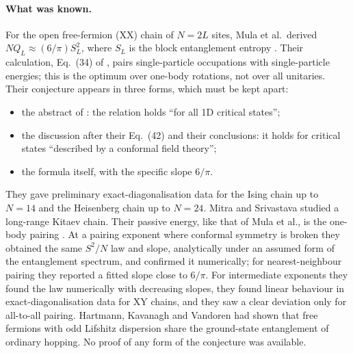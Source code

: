 \documentclass[11pt,a4paper]{article}
\theoremstyle{remark}
\begin{document}
\paragraph{What was known.} For the open free-fermion (XX) chain of $N=2L$ sites, Mula et al.\ derived $NQ_L\approx(6/\pi)S_L^2$, where $S_L$ is the block entanglement entropy \cite[Eq.~(42)]{mula}. Their calculation, Eq.~(34) of \cite{mula}, pairs single-particle occupations with single-particle energies; this is the optimum over one-body rotations, not over all unitaries. Their conjecture appears in three forms, which must be kept apart:
\begin{itemize}[leftmargin=2.2em,itemsep=1pt]
\item[(A)] the abstract of \cite{mula}: the relation holds ``for all 1D critical states'';
\item[(B)] the discussion after their Eq.~(42) and their conclusions: it holds for critical states ``described by a conformal field theory'';
\item[(C)] the formula itself, with the specific slope $6/\pi$.
\end{itemize}
They gave preliminary exact-diagonalisation data for the Ising chain up to $N=14$ and the Heisenberg chain up to $N=24$. Mitra and Srivastava \cite{mitra} studied a long-range Kitaev chain. Their passive energy, like that of Mula et al., is the one-body pairing \cite[Eq.~(22)]{mitra}. At a pairing exponent where conformal symmetry is broken they obtained the same $S^2/N$ law and slope, analytically under an assumed form of the entanglement spectrum, and confirmed it numerically; for nearest-neighbour pairing they reported a fitted slope close to $6/\pi$. For intermediate exponents they found the law numerically with decreasing slopes, they found linear behaviour in exact-diagonalisation data for XY chains, and they saw a clear deviation only for all-to-all pairing. Hartmann, Kavanagh and Vandoren \cite{hartmann} had shown that free fermions with odd Lifshitz dispersion share the ground-state entanglement of ordinary hopping. No proof of any form of the conjecture was available.
\end{document}
